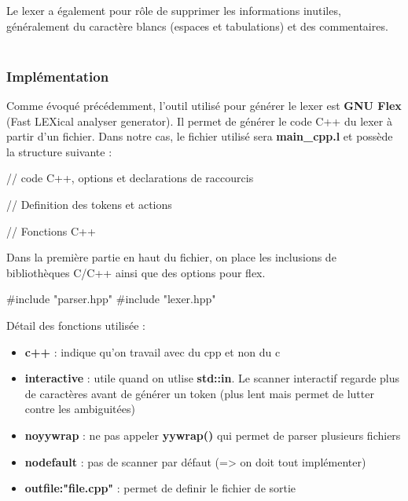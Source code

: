 \documentclass[a4paper]{article}%
\begin{document}
Le \gls{lexer} a également pour rôle de supprimer les informations inutiles,
généralement du caractère blancs (espaces et tabulations) et des
commentaires.\\~\\

\subsubsection*{Implémentation}

Comme évoqué précédemment, l'outil utilisé pour générer le \gls{lexer} est
\textbf{GNU Flex} (Fast LEXical analyser generator). Il permet de générer le
code C++ du \gls{lexer} à partir d'un fichier. Dans notre cas, le fichier utilisé
sera \textbf{main\_cpp.l} et possède la structure suivante
\cite{compilerFlexBison} :

\begin{code}
// code C++, options et declarations de raccourcis

// Definition des tokens et actions

// Fonctions C++
\end{code}\leavevmode\newline

\noindent

Dans la première partie en haut du fichier, on place les inclusions de
bibliothèques C/C++ ainsi que des options pour flex.

\begin{code}
#include "parser.hpp"
#include "lexer.hpp"

\end{code}\leavevmode\newline

Détail des fonctions utilisée :
\begin{itemize}
  \item \textbf{c++} : indique qu'on travail avec du cpp et non du c
  \item \textbf{interactive} : utile quand on utlise \textbf{std::in}. Le
    scanner interactif regarde plus de caractères avant de générer un token
    (plus lent mais permet de lutter contre les ambiguitées)
  \item \textbf{noyywrap} : ne pas appeler \textbf{yywrap()} qui permet de parser plusieurs fichiers
  \item \textbf{nodefault} : pas de scanner par défaut (=> on doit tout implémenter)
  \item \textbf{outfile:"file.cpp"} : permet de definir le fichier de sortie
\end{itemize}\leavevmode\\
\end{document}
